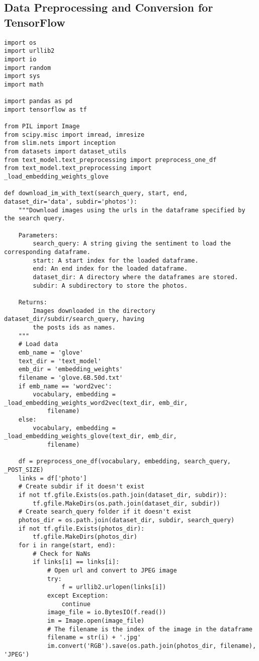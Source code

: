\subsection{Data Preprocessing and Conversion for TensorFlow}
\begin{lstlisting}
import os
import urllib2
import io
import random
import sys
import math

import pandas as pd
import tensorflow as tf

from PIL import Image
from scipy.misc import imread, imresize
from slim.nets import inception
from datasets import dataset_utils
from text_model.text_preprocessing import preprocess_one_df
from text_model.text_preprocessing import _load_embedding_weights_glove

def download_im_with_text(search_query, start, end, dataset_dir='data', subdir='photos'):
    """Download images using the urls in the dataframe specified by the search query.

    Parameters:
        search_query: A string giving the sentiment to load the corresponding dataframe.
        start: A start index for the loaded dataframe.
        end: An end index for the loaded dataframe.
        dataset_dir: A directory where the dataframes are stored.
        subdir: A subdirectory to store the photos.

    Returns:
        Images downloaded in the directory dataset_dir/subdir/search_query, having 
        the posts ids as names.
    """
    # Load data
    emb_name = 'glove'
    text_dir = 'text_model'
    emb_dir = 'embedding_weights'
    filename = 'glove.6B.50d.txt'
    if emb_name == 'word2vec':
        vocabulary, embedding = _load_embedding_weights_word2vec(text_dir, emb_dir, 
            filename)
    else:
        vocabulary, embedding = _load_embedding_weights_glove(text_dir, emb_dir, 
            filename)

    df = preprocess_one_df(vocabulary, embedding, search_query, _POST_SIZE)
    links = df['photo']
    # Create subdir if it doesn't exist
    if not tf.gfile.Exists(os.path.join(dataset_dir, subdir)):
        tf.gfile.MakeDirs(os.path.join(dataset_dir, subdir))
    # Create search_query folder if it doesn't exist
    photos_dir = os.path.join(dataset_dir, subdir, search_query)
    if not tf.gfile.Exists(photos_dir):
        tf.gfile.MakeDirs(photos_dir)
    for i in range(start, end):
        # Check for NaNs
        if links[i] == links[i]:
            # Open url and convert to JPEG image
            try:
                f = urllib2.urlopen(links[i])
            except Exception:
                continue
            image_file = io.BytesIO(f.read())
            im = Image.open(image_file)
            # The filename is the index of the image in the dataframe
            filename = str(i) + '.jpg'
            im.convert('RGB').save(os.path.join(photos_dir, filename), 'JPEG')
            

\end{lstlisting}
